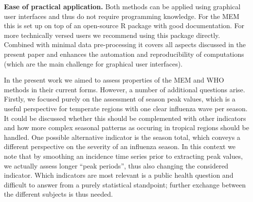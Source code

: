 \documentclass{article}
\begin{document}
\begin{description}
\item \textbf{Ease of practical application.} Both methods can be applied using graphical user interfaces and thus do not require programming knowledge. For the MEM this is set up on top of an open-source R package with good documentation. For more technically versed users we recommend using this package directly. Combined with minimal data pre-processing it covers all aspects discussed in the present paper and enhances the automation and reproducibility of computations (which are the main challenge for graphical user interfaces).
\end{description}



In the present work we aimed to assess properties of the MEM and WHO methods in their current forms. However, a number of additional questions arise. Firstly, we focused purely on the assessment of season peak values, which is a useful perspective for temperate regions with one clear influenza wave per season. It could be discussed whether this should be complemented with other indicators and how more complex seasonal patterns as occuring in tropical regions should be handled. One possible alternative indicator is the season total, which conveys a different perspective on the severity of an influenza season. In this context we note that by smoothing an incidence time series prior to extracting peak values, we actually assess longer ``peak periods'', thus also changing the considered indicator. Which indicators are most relevant is a public health question and difficult to answer from a purely statistical standpoint; further exchange between the different subjects is thus needed. %
\end{document}
